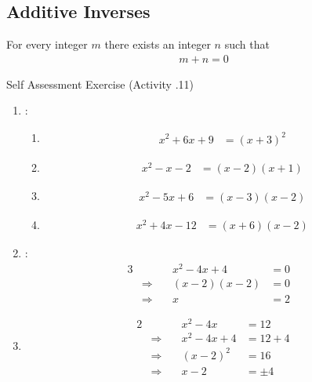 \documentclass[../notes.tex]{subfiles}
\begin{document}
			\subsection{Additive Inverses}
				For every integer $m$ there exists an integer $n$ such that
				\begin{align*}
					m + n = 0
				\end{align*}
			\pagebreak
			\begin{exercise}{Self Assessment Exercise (Activity \thechapter.11)}
				\begin{enumerate}
					\item {}:
						\begin{enumerate}[label=(\alph*)]
							\item \moveup
								\begin{align*}
									x^{2} + 6x + 9 &= (x + 3)^{2}
								\end{align*}
							\item \moveup
								\begin{align*}
									x^{2} - x - 2 &= (x - 2)(x + 1)
								\end{align*}
							\item \moveup
								\begin{align*}
									x^{2} - 5x + 6 &= (x - 3)(x - 2)
								\end{align*}
							\item \moveup
								\begin{align*}
									x^{2} + 4x - 12 &= (x + 6)(x - 2)
								\end{align*}
						\end{enumerate}
					\item {}:
						\begin{alignat*}{3}
							& \qquad & x^{2} - 4x + 4 &= 0\\
							& \Rightarrow \quad & (x - 2)(x - 2) &= 0\\
							& \Rightarrow \quad &x &= 2 &
						\end{alignat*}
					\item {}
						\begin{alignat*}{2}
							& \qquad &x^{2} - 4x &= 12\\
							& \Rightarrow \quad &x^{2} - 4x + 4 &= 12 + 4\\
							& \Rightarrow \quad &(x - 2)^{2} &= 16\\
							& \Rightarrow \quad & x - 2 &= \pm 4

\end{alignat*}
\end{enumerate}
\end{exercise}
\end{document}
